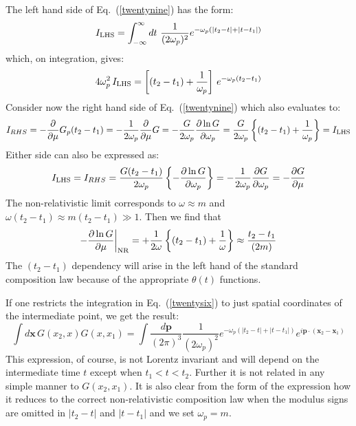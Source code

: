 \documentclass{article}
\def\eq#1{{Eq.~(\ref{#1})}}
\begin{document}
The left hand side of \eq{twentynine} has the form:
\begin{equation}
I_{\rm LHS}    = \int_{-\infty}^\infty dt\  \frac{1}{(2\omega_p)^2} e^{-\omega_p(|t_2 -t| + |t-t_1|)}
\end{equation}
which, on integration, gives:
\begin{equation}
 4\omega_p^2 \, I_{\rm LHS} = \left[ (t_2 - t_1) + \frac{1}{\omega_p} \right] \, e^{-\omega_p(t_2 -t_1)}
\end{equation} 
Consider now the right hand side of \eq{twentynine} which also evaluates to:
\begin{equation}
 I_{RHS} = -\frac{\partial}{\partial \mu} G_p(t_2 - t_1) = -  \frac{1}{2\omega_p}\frac{\partial}{\partial \mu} G = - \frac{G}{2\omega_p} \frac{\partial \ln G}{\partial \omega_p}
 =\frac{G}{2\omega_p} \left\{ (t_2-t_1) + \frac{1}{\omega_p}\right\}= I_{\rm LHS}
\end{equation}
Either side can also be expressed as:
\begin{equation}
 I_{\rm LHS} =  I_{RHS}=\frac{G(t_2-t_1)}{2\omega_p} \left\{ -\frac{\partial \ln G}{\partial \omega_p}\right\} = - \frac{1}{2\omega_p}\frac{\partial G}{\partial \omega_p} = - \frac{\partial G}{\partial \mu}
\end{equation} 
The non-relativistic limit corresponds to $\omega\approx m$ and $\omega(t_2-t_1)\approx m(t_2-t_1)\gg 1$. Then we find that
\begin{equation}
 -\frac{\partial \ln G}{\partial \mu} \bigg|_{\rm NR} = + \frac{1}{2\omega}  \left\{ (t_2-t_1) + \frac{1}{\omega}\right\}
 \approx \frac{t_2 - t_1}{(2m)}
\end{equation} 
The $(t_2-t_1)$ dependency will arise in the left hand of the standard composition law because of the appropriate $\theta(t)$ functions.

If one restricts the integration in \eq{twentysix} to just spatial coordinates of the intermediate point, we get the result:
\begin{equation}
 \int d\bm x \, G (x_2,x) G (x,x_1) = \int\frac{d\bm p}{(2\pi)^3} 
 \frac{1}{(2\omega_p)^2} e^{-\omega_p(|t_2 -t| + |t-t_1|)}e^{i\bm p\cdot(\bm x_2-\bm x_1)}
 \end{equation} 
This expression, of course, is not Lorentz invariant and will depend on the intermediate time $t$ except when $t_1<t<t_2$. Further it is not related in any simple manner to $G(x_2,x_1)$. It is also clear from the form of the expression how it reduces to the correct non-relativistic composition law when the modulus signs are omitted in $|t_2 -t|$ and $|t-t_1|$ and we set $\omega_p=m$.
\end{document}
